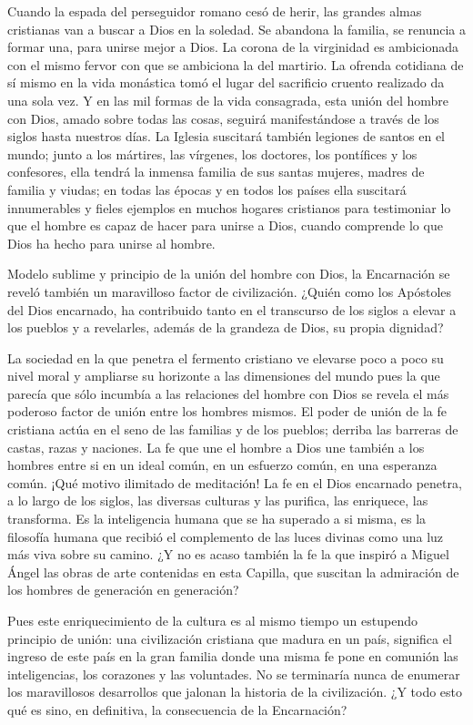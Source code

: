 \begin{body}
	Cuando la espada del perseguidor romano cesó de herir, las grandes almas cristianas van a buscar a Dios en la soledad. Se abandona la familia, se renuncia a formar una, para unirse mejor a Dios. La corona de la virginidad es ambicionada con el mismo fervor con que se ambiciona la del martirio. La ofrenda cotidiana de sí mismo en la vida monástica tomó el lugar del sacrificio cruento realizado da una sola vez. Y en las mil formas de la vida consagrada, esta unión del hombre con Dios, amado sobre todas las cosas, seguirá manifestándose a través de los siglos hasta nuestros días. La Iglesia suscitará también legiones de santos en el mundo; junto a los mártires, las vírgenes, los doctores, los pontífices y los confesores, ella tendrá la inmensa familia de sus santas mujeres, madres de familia y viudas; en todas las épocas y en todos los países ella suscitará innumerables y fieles ejemplos en muchos hogares cristianos para testimoniar lo que el hombre es capaz de hacer para unirse a Dios, cuando comprende lo que Dios ha hecho para unirse al hombre.
	
	Modelo sublime y principio de la unión del hombre con Dios, la Encarnación se reveló también un maravilloso factor de civilización. ¿Quién como los Apóstoles del Dios encarnado, ha contribuido tanto en el transcurso de los siglos a elevar a los pueblos y a revelarles, además de la grandeza de Dios, su propia dignidad?
	
	La sociedad en la que penetra el fermento cristiano ve elevarse poco a poco su nivel moral y ampliarse su horizonte a las dimensiones del mundo pues la que parecía que sólo incumbía a las relaciones del hombre con Dios se revela el más poderoso factor de unión entre los hombres mismos. El poder de unión de la fe cristiana actúa en el seno de las familias y de los pueblos; derriba las barreras de castas, razas y naciones. La fe que une el hombre a Dios une también a los hombres entre si en un ideal común, en un esfuerzo común, en una esperanza común. ¡Qué motivo ilimitado de meditación! La fe en el Dios encarnado penetra, a lo largo de los siglos, las diversas culturas y las purifica, las enriquece, las transforma. Es la inteligencia humana que se ha superado a si misma, es la filosofía humana que recibió el complemento de las luces divinas como una luz más viva sobre su camino. ¿Y no es acaso también la fe la que inspiró a Miguel Ángel las obras de arte contenidas en esta Capilla, que suscitan la admiración de los hombres de generación en generación?
	
	Pues este enriquecimiento de la cultura es al mismo tiempo un estupendo principio de unión: una civilización cristiana que madura en un país, significa el ingreso de este país en la gran familia donde una misma fe pone en comunión las inteligencias, los corazones y las voluntades. No se terminaría nunca de enumerar los maravillosos desarrollos que jalonan la historia de la civilización. ¿Y todo esto qué es sino, en definitiva, la consecuencia de la Encarnación?
	

\end{body}

